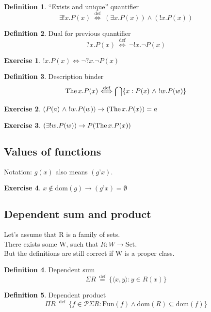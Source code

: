 \documentclass[10pt,a4paper]{article}
\theoremstyle{definition}
\newtheorem{definition}{Definition}[section]
\newtheorem{exercise}{Exercise}[section]
\newcommand{\Fun}{{\textrm{Fun}}}
\newcommand{\dom}{{\textrm{dom}}}
\newcommand{\apo}{{\textrm{'}}}  %
\newcommand{\The}{{\textrm{The\,}}}
\newcommand{\LRA}{\Longleftrightarrow}
\newcommand{\defi}{{\textrm{def}}}
\newcommand{\eqdef}{{\ \stackrel{\defi}{=}\ }}
\newcommand{\propdef}{{\stackrel{\defi}{\ \Longleftrightarrow\ }}}
\newcommand{\inter}{{\bigcap}}
\newcommand{\Set}{{\textrm{Set}}}
\newcommand{\Pow}{{\mathcal{P}}}
\begin{document}
\begin{definition} ``Exists and unique'' quantifier
$$\exists !x. P(x) \propdef (\exists x. P(x))\land(!x. P(x))$$
\end{definition}

\begin{definition}  Dual for previous quantifier 
$$?x. P(x) \propdef \neg !x. \neg P(x)$$
\end{definition}

\begin{exercise}
$!x. P(x) \LRA \neg ?x. \neg P(x)$
\end{exercise}

\begin{definition} Description binder
$$\The x. P(x) \propdef \inter \{x:P(x)\ \land\ !w.P(w)\}$$
\end{definition}

\begin{exercise}
$(P(a)\ \land\ !w.P(w)) \rightarrow (\The x. P(x))=a$
\end{exercise}

\begin{exercise}
$(\exists !w.P(w)) \rightarrow P(\The x. P(x))$
\end{exercise}

\subsection{Values of functions}
Notation: $g(x)$ also means $(g\apo x).$\\

\begin{exercise}
$x\notin \dom(g)\to (g\apo x)=\emptyset$
\end{exercise}

\subsection{Dependent sum and product}
Let's assume that R is a family of sets.\\
There exists some W, such that $R:W\to\Set$.\\
But the definitions are still correct if W is a proper class.\\
\begin{definition} Dependent sum
$$\Sigma R\eqdef\{\langle x, y\rangle: y\in R(x)\}$$
\end{definition}
\begin{definition} Dependent product
$$\Pi R\eqdef\{ f\in \Pow\Sigma R: \Fun(f)\land \dom(R)\subseteq \dom(f)\}$$
\end{definition}
\end{document}
